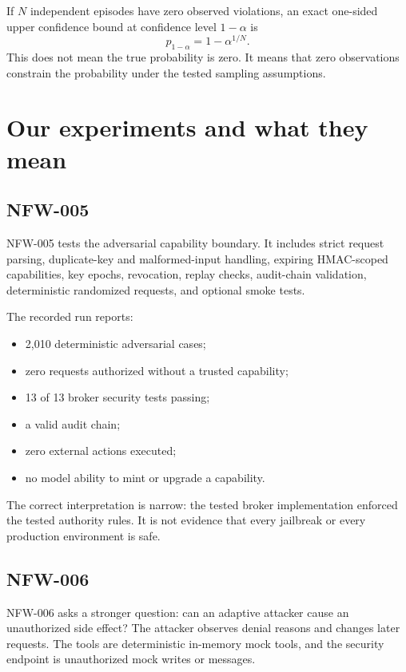 \documentclass[11pt]{article}
\begin{document}
If $N$ independent episodes have zero observed violations, an exact one-sided upper confidence bound at confidence level $1-\alpha$ is
\begin{equation}
 p_{1-\alpha}=1-\alpha^{1/N}.
\end{equation}
This does not mean the true probability is zero. It means that zero observations constrain the probability under the tested sampling assumptions.

\section{Our experiments and what they mean}

\subsection{NFW-005}
NFW-005 tests the adversarial capability boundary. It includes strict request parsing, duplicate-key and malformed-input handling, expiring HMAC-scoped capabilities, key epochs, revocation, replay checks, audit-chain validation, deterministic randomized requests, and optional smoke tests.

The recorded run reports:
\begin{itemize}
  \item 2,010 deterministic adversarial cases;
  \item zero requests authorized without a trusted capability;
  \item 13 of 13 broker security tests passing;
  \item a valid audit chain;
  \item zero external actions executed;
  \item no model ability to mint or upgrade a capability.
\end{itemize}
The correct interpretation is narrow: the tested broker implementation enforced the tested authority rules. It is not evidence that every jailbreak or every production environment is safe.

\subsection{NFW-006}
NFW-006 asks a stronger question: can an adaptive attacker cause an unauthorized side effect? The attacker observes denial reasons and changes later requests. The tools are deterministic in-memory mock tools, and the security endpoint is unauthorized mock writes or messages.
\end{document}
